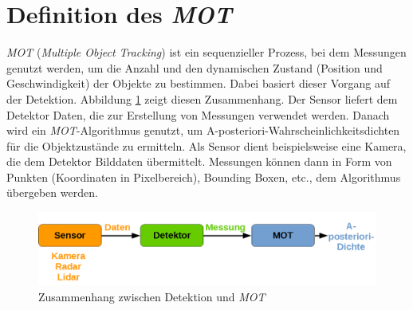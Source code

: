 \documentclass[10pt,a4paper]{article}
\begin{document}
\section{Definition des \textit{MOT}}
	\textit{MOT} (\textit{Multiple Object Tracking}) ist ein sequenzieller Prozess, bei dem Messungen genutzt werden, um die Anzahl und den dynamischen Zustand (Position und Geschwindigkeit) der Objekte zu bestimmen. Dabei basiert dieser Vorgang auf der Detektion. Abbildung \ref{fig: Zusammenhang zwischen Detektion und MOT} zeigt diesen Zusammenhang. Der Sensor liefert dem Detektor Daten, die zur Erstellung von Messungen verwendet werden. Danach wird ein \textit{MOT}-Algorithmus genutzt, um A-posteriori-Wahrscheinlichkeitsdichten für die Objektzustände zu ermitteln. Als Sensor dient beispielsweise eine Kamera, die dem Detektor Bilddaten übermittelt. Messungen können dann in Form von Punkten (Koordinaten in Pixelbereich), Bounding Boxen, etc., dem Algorithmus übergeben werden.
	\begin{figure}[h]
		\centering
		\includegraphics[width=0.7\linewidth]{./Pictures_report/Zusammenhang zwischen Detektion und MOT.png}
		\caption{Zusammenhang zwischen Detektion und \textit{MOT}}
		\label{fig: Zusammenhang zwischen Detektion und MOT}
	\end{figure}
\end{document}

